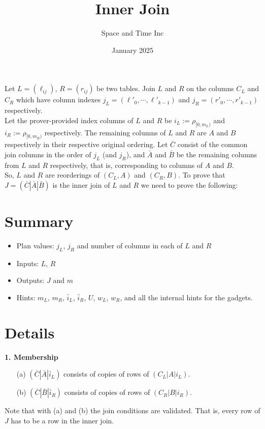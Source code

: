 \documentclass[11pt]{article}
\title{Inner Join}
\author{Space and Time Inc}
\date{January 2025}
\begin{document}
\maketitle

\noindent Let $L = (\ell_{ij})$, $R = (r_{ij})$ be two tables. Join $L$ and $R$ on the columns $C_L$ and $C_R$ which have column indexes $j_L = (\ell'_0,\cdots, \ell'_{k-1})$ and $j_R = (r'_0,\cdots, r'_{k-1})$ respectively. \\
\noindent Let the prover-provided index columns of $L$ and $R$ be $i_L:=\rho_{[0, m_L)}$ and $i_R:=\rho_{[0, m_R)}$ respectively. The remaining columns of $L$ and $R$ are $A$ and $B$ respectively in their respective original ordering. Let $\bar{C}$ consist of the common join columns in the order of $j_L$ (and $j_R$), and $\bar{A}$ and $\bar{B}$ be the remaining columns from $L$ and $R$ respectively, that is, corresponding to columns of $A$ and $B$.\\
So, $L$ and $R$ are reorderings of $(C_L,A)$ and $(C_R,B)$.  To prove that $J = (\bar{C}|\bar{A}|\bar{B})$ is the inner join of $L$ and $R$ we need to prove the following:\\

\section{Summary}
\begin{itemize}
    \item Plan values: $j_L$, $j_R$ and number of columns in each of $L$ and $R$
    \item Inputs: $L$, $R$
    \item Outputs: $J$ and $m$
    \item Hints: $m_L$, $m_R$, $\bar{i}_L$, $\bar{i}_R$, $U$, $w_L$, $w_R$, and all the internal hints for the gadgets.
\end{itemize}

\section{Details}
\textbf{1. Membership}
\begin{enumerate}
  \item[(a)] $(\bar{C}|\bar{A}|\bar{i}_L)$ consists of copies of rows of $(C_L|A|i_L)$.
  \item[(b)] $(\bar{C}|\bar{B}|\bar{i}_R)$ consists of copies of rows of $(C_R|B|i_R)$.
\end{enumerate}

\noindent Note that with (a) and (b) the join conditions are validated. That is, every row of $J$ has to be a row in the inner join.\\
\end{document}
